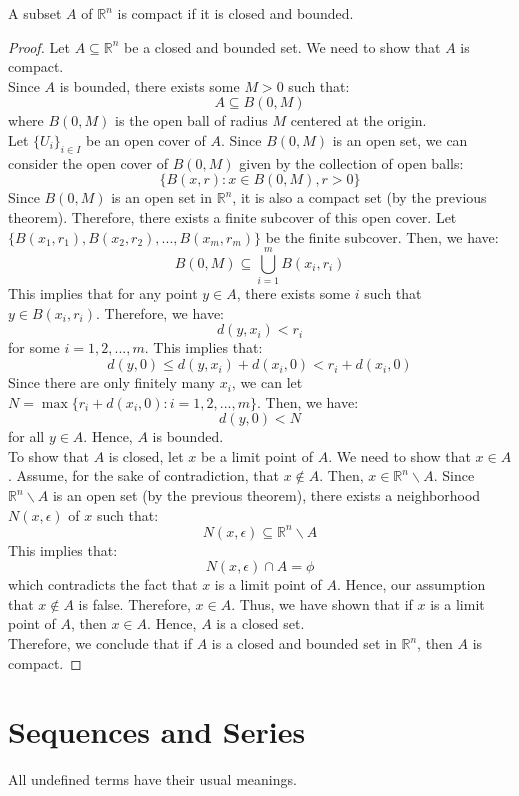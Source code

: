 \documentclass[openany]{book}
\numberwithin{equation}{section}
\begin{document}
    A subset $A$ of $\mathbb{R}^n$ is compact if it is closed and bounded.
\par
\begin{proof}
    Let $A \subseteq \mathbb{R}^n$ be a closed and bounded set. We need to show that $A$ is compact. \\
    Since $A$ is bounded, there exists some $M > 0$ such that:
    $$A \subseteq B(0, M)$$
    where $B(0, M)$ is the open ball of radius $M$ centered at the origin. \\
    Let $\{U_i\}_{i \in I}$ be an open cover of $A$. Since $B(0, M)$ is an open set, we can consider the open cover of $B(0, M)$ given by the collection of open balls:
    $$\{B(x, r) : x \in B(0, M), r > 0\}$$
    Since $B(0, M)$ is an open set in $\mathbb{R}^n$, it is also a compact set (by the previous theorem). Therefore, there exists a finite subcover of this open cover. Let $\{B(x_1, r_1), B(x_2, r_2), ..., B(x_m, r_m)\}$ be the finite subcover. Then, we have:
    $$B(0, M) \subseteq \bigcup_{i=1}^{m} B(x_i, r_i)$$
    This implies that for any point $y \in A$, there exists some $i$ such that $y \in B(x_i, r_i)$. Therefore, we have:
    $$d(y, x_i) < r_i$$
    for some $i = 1, 2, ..., m$. This implies that:
    $$d(y, 0) \leq d(y, x_i) + d(x_i, 0) < r_i + d(x_i, 0)$$
    Since there are only finitely many $x_i$, we can let $N = \max\{r_i + d(x_i, 0) : i = 1, 2, ..., m\}$. Then, we have:
    $$d(y, 0) < N$$
    for all $y \in A$. Hence, $A$ is bounded. \\
    To show that $A$ is closed, let $x$ be a limit point of $A$. We need to show that $x \in A$. Assume, for the sake of contradiction, that $x \notin A$. Then, $x \in \mathbb{R}^n \backslash A$. Since $\mathbb{R}^n \backslash A$ is an open set (by the previous theorem), there exists a neighborhood $N(x, \epsilon)$ of $x$ such that:
    $$N(x, \epsilon) \subseteq \mathbb{R}^n \backslash A$$
    This implies that:
    $$N(x, \epsilon) \cap A = \phi$$
    which contradicts the fact that $x$ is a limit point of $A$. Hence, our assumption that $x \notin A$ is false. Therefore, $x \in A$. Thus, we have shown that if $x$ is a limit point of $A$, then $x \in A$. Hence, $A$ is a closed set. \\
    Therefore, we conclude that if $A$ is a closed and bounded set in $\mathbb{R}^n$, then $A$ is compact.
\end{proof}
\chapter{Sequences and Series}
All undefined terms have their usual meanings. 
\end{document}
